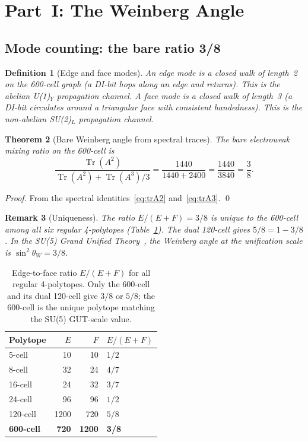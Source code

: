 \documentclass[11pt,letterpaper]{article}
\newtheorem{theorem}{Theorem}[section]
\newtheorem{definition}[theorem]{Definition}
\newtheorem{remark}[theorem]{Remark}
\newcommand{\Tr}{\operatorname{Tr}}
\begin{document}
\section{Part~I: The Weinberg Angle}
\label{sec:weinberg}

\subsection{Mode counting: the bare ratio 3/8}
\begin{definition}[Edge and face modes]
An \emph{edge mode} is a closed walk of length~2 on the 600-cell graph (a DI-bit hops along an edge and returns). This is the abelian U(1)$_Y$ propagation channel. A \emph{face mode} is a closed walk of length~3 (a DI-bit circulates around a triangular face with consistent handedness). This is the non-abelian SU(2)$_L$ propagation channel.
\end{definition}

\begin{theorem}[Bare Weinberg angle from spectral traces]
\label{thm:bare38}
The bare electroweak mixing ratio on the 600-cell is
\begin{equation}
\frac{\Tr(A^2)}{\Tr(A^2) + \Tr(A^3)/3} = \frac{1440}{1440 + 2400} = \frac{1440}{3840} = \frac{3}{8}.
\label{eq:bare38}
\end{equation}
\end{theorem}
\begin{proof}
From the spectral identities~\eqref{eq:trA2} and~\eqref{eq:trA3}. \qed
\end{proof}

\begin{remark}[Uniqueness]
The ratio $E/(E+F) = 3/8$ is unique to the 600-cell among all six regular 4-polytopes (Table~\ref{tab:polytopes}). The dual 120-cell gives $5/8 = 1 - 3/8$. In the SU(5) Grand Unified Theory~\citep{georgi1974}, the Weinberg angle at the unification scale is $\sin^2\theta_W = 3/8$.
\end{remark}

\begin{table}[H]
\centering
\caption{Edge-to-face ratio $E/(E+F)$ for all regular 4-polytopes. Only the 600-cell and its dual 120-cell give $3/8$ or $5/8$; the 600-cell is the unique polytope matching the SU(5) GUT-scale value.}
\label{tab:polytopes}
\begin{tabular}{@{}lrrl@{}}
\toprule
Polytope & $E$ & $F$ & $E/(E+F)$ \\
\midrule
5-cell & 10 & 10 & $1/2$ \\
8-cell & 32 & 24 & $4/7$ \\
16-cell & 24 & 32 & $3/7$ \\
24-cell & 96 & 96 & $1/2$ \\
120-cell & 1200 & 720 & $5/8$ \\
\textbf{600-cell} & \textbf{720} & \textbf{1200} & \textbf{3/8} \\
\bottomrule
\end{tabular}
\end{table}
\end{document}
